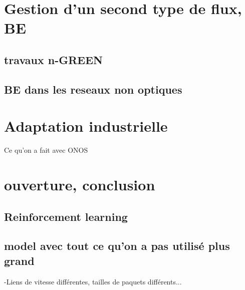 \documentclass[a4paper,10pt]{article}
\begin{document}
\section{Gestion d'un second type de flux, BE}
\subsection{travaux n-GREEN}
\subsection{BE dans les reseaux non optiques}
\section{Adaptation industrielle}
Ce qu'on a fait avec ONOS
\section{ouverture, conclusion}
\subsection{Reinforcement learning}
\subsection{model avec tout ce qu'on a pas utilisé plus grand}
-Liens de vitesse différentes, tailles de paquets différents...
\end{document}
